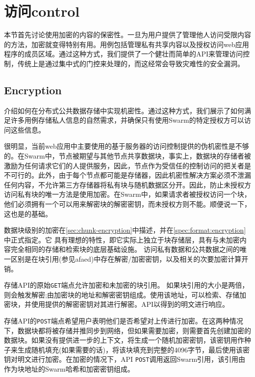 \section{访问control\statusgreen}\label{sec:access-control}

\green{}

本节首先讨论使用加密的内容的保密性。一旦为用户提供了管理他人访问受限内容的方法，加密就变得特别有用。用例包括管理私有共享内容以及授权访问web应用程序的成员区域。通过这种方式，我们提供了一个健壮而简单的API来管理访问控制，传统上是通过集中式的门控来处理的，而这经常会导致灾难性的安全漏洞。

\subsection{Encryption\statusgreen}\label{sec:encryption}

介绍如何在分布式公共数据存储中实现机密性。通过这种方式，我们展示了如何满足许多用例存储私人信息的自然需求，并确保只有使用Swarm的特定授权方可以访问这些信息。

很明显，当前web应用中主要使用的基于服务器的访问控制提供的伪机密性是不够的。在Swarm中，节点被期望与其他节点共享数据块，事实上，数据块的存储者被激励为任何请求它们的人提供服务，因此，节点作为受信任的控制访问的把关者是不可行的。此外，由于每个节点都可能是存储器，因此机密性解决方案必须不泄漏任何内容，不允许第三方存储器将私有块与随机数据区分开。因此，防止未授权方访问私有块的唯一方法是使用加密。在Swarm中，如果请求者被授权访问一个块，他们必须拥有一个可以用来解密块的解密密钥，而未授权方则不能。顺便说一下，这也是的基础。

数据块级别的加密在\ref{sec:chunk-encryption}中描述，并在\ref{spec:format:encryption}中正式指定。它
具有理想的特性，即它实际上独立于块存储层，具有与未加密内容完全相同的存储和检索块的底层基础设施。
访问私有数据和公共数据之间的唯一区别是在块引用(参见afaed)中存在解密/加密密钥，以及相关的次要加密计算开销。


存储API的原始\lstinline{GET}端点允许加密和未加密的块引用。
如果块引用的大小是两倍，则会触发解密;由加密块的地址和解密密钥组成。使用该地址，可以检索、存储加密块，并使用提供的解密密钥对其进行解密。API以得到的明文进行响应。

存储API的\lstinline{POST}端点希望用户表明他们是否希望对上传进行加密。在这两种情况下，数据块都将被存储并推同步到网络，但如果需要加密，则需要首先创建加密的数据块。如果没有提供进一步的上下文，将生成一个随机加密密钥，该密钥用作种子来生成随机填充(如果需要的话)，将该块填充到完整的4096字节，最后使用该密钥对明文进行加密。在加密的情况下，API \lstinline{POST}调用返回Swarm引用，该引用由作为块地址的Swarm哈希和加密密钥组成。

